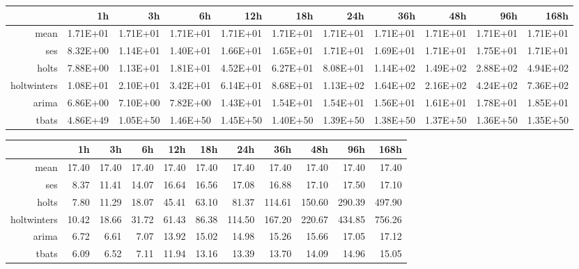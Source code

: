 \begin{landscape}
\begin{table}[ht]
\centering
\begin{tabular}{rrrrrrrrrrr}
  \hline
 & 1h & 3h & 6h & 12h & 18h & 24h & 36h & 48h & 96h & 168h \\ 
  \hline
mean & 1.71E+01 & 1.71E+01 & 1.71E+01 & 1.71E+01 & 1.71E+01 & 1.71E+01 & 1.71E+01 & 1.71E+01 & 1.71E+01 & 1.71E+01 \\ 
  ses & 8.32E+00 & 1.14E+01 & 1.40E+01 & 1.66E+01 & 1.65E+01 & 1.71E+01 & 1.69E+01 & 1.71E+01 & 1.75E+01 & 1.71E+01 \\ 
  holts & 7.88E+00 & 1.13E+01 & 1.81E+01 & 4.52E+01 & 6.27E+01 & 8.08E+01 & 1.14E+02 & 1.49E+02 & 2.88E+02 & 4.94E+02 \\ 
  holtwinters & 1.08E+01 & 2.10E+01 & 3.42E+01 & 6.14E+01 & 8.68E+01 & 1.13E+02 & 1.64E+02 & 2.16E+02 & 4.24E+02 & 7.36E+02 \\ 
  arima & 6.86E+00 & 7.10E+00 & 7.82E+00 & 1.43E+01 & 1.54E+01 & 1.54E+01 & 1.56E+01 & 1.61E+01 & 1.78E+01 & 1.85E+01 \\ 
  tbats & 4.86E+49 & 1.05E+50 & 1.46E+50 & 1.45E+50 & 1.40E+50 & 1.39E+50 & 1.38E+50 & 1.37E+50 & 1.36E+50 & 1.35E+50 \\ 
   \hline
\end{tabular}
\end{table}
\begin{table}[ht]
\centering
\begin{tabular}{rrrrrrrrrrr}
  \hline
 & 1h & 3h & 6h & 12h & 18h & 24h & 36h & 48h & 96h & 168h \\ 
  \hline
mean & 17.40 & 17.40 & 17.40 & 17.40 & 17.40 & 17.40 & 17.40 & 17.40 & 17.40 & 17.40 \\ 
  ses & 8.37 & 11.41 & 14.07 & 16.64 & 16.56 & 17.08 & 16.88 & 17.10 & 17.50 & 17.10 \\ 
  holts & 7.80 & 11.29 & 18.07 & 45.41 & 63.10 & 81.37 & 114.61 & 150.60 & 290.39 & 497.90 \\ 
  holtwinters & 10.42 & 18.66 & 31.72 & 61.43 & 86.38 & 114.50 & 167.20 & 220.67 & 434.85 & 756.26 \\ 
  arima & 6.72 & 6.61 & 7.07 & 13.92 & 15.02 & 14.98 & 15.26 & 15.66 & 17.05 & 17.12 \\ 
  tbats & 6.09 & 6.52 & 7.11 & 11.94 & 13.16 & 13.39 & 13.70 & 14.09 & 14.96 & 15.05 \\ 

\end{tabular}
\end{table}
\end{landscape}
